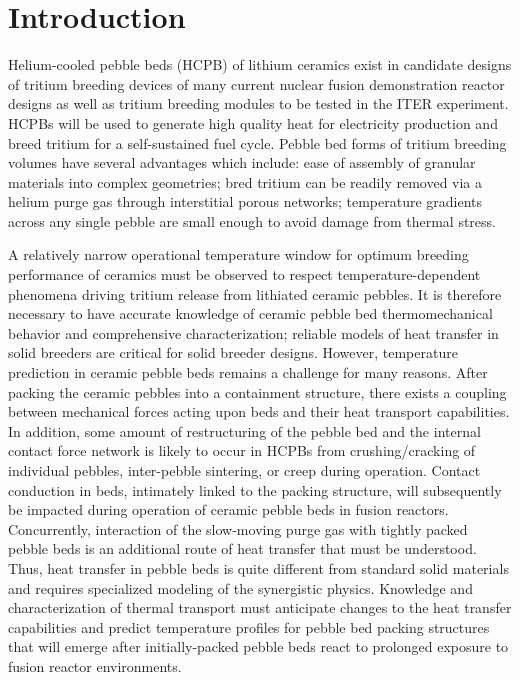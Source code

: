 \chapter{Introduction} \label{sec:introduction}
Helium-cooled pebble beds (HCPB) of lithium ceramics exist in candidate designs of tritium breeding devices of many current nuclear fusion demonstration reactor designs as well as tritium breeding modules to be tested in the ITER experiment. HCPBs will be used to generate high quality heat for electricity production and breed tritium for a self-sustained fuel cycle. Pebble bed forms of tritium breeding volumes have several advantages which include: ease of assembly of granular materials into complex geometries; bred tritium can be readily removed via a helium purge gas through interstitial porous networks; temperature gradients across any single pebble are small enough to avoid damage from thermal stress. 

A relatively narrow operational temperature window for optimum breeding performance of ceramics must be observed to respect temperature-dependent phenomena driving tritium release from lithiated ceramic pebbles. It is therefore necessary to have accurate knowledge of ceramic pebble bed thermomechanical behavior and comprehensive characterization; reliable models of heat transfer in solid breeders are critical for solid breeder designs. However, temperature prediction in ceramic pebble beds remains a challenge for many reasons. After packing the ceramic pebbles into a containment structure, there exists a coupling between mechanical forces acting upon beds and their heat transport capabilities. In addition, some amount of restructuring of the pebble bed and the internal contact force network is likely to occur in HCPBs from crushing/cracking of individual pebbles, inter-pebble sintering, or creep during operation. Contact conduction in beds, intimately linked to the packing structure, will subsequently be impacted during operation of ceramic pebble beds in fusion reactors. Concurrently, interaction of the slow-moving purge gas with tightly packed pebble beds is an additional route of heat transfer that must be understood. Thus, heat transfer in pebble beds is quite different from standard solid materials and requires specialized modeling of the synergistic physics. Knowledge and characterization of thermal transport must anticipate changes to the heat transfer capabilities and predict temperature profiles for pebble bed packing structures that will emerge after initially-packed pebble beds react to prolonged exposure to fusion reactor environments.

